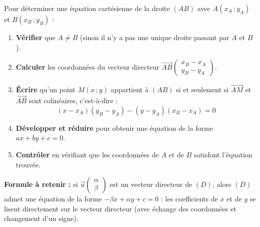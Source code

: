\documentclass[11pt]{article}
\begin{document}
\begin{methode}
Pour déterminer une équation cartésienne de la droite $(AB)$ avec $A(x_A\,;y_A)$ et $B(x_B\,;y_B)$ :
\begin{enumerate}
\item \textbf{Vérifier} que $A \neq B$ (sinon il n'y a pas une unique droite passant par $A$ et $B$).
\item \textbf{Calculer} les coordonnées du vecteur directeur $\overrightarrow{AB}\begin{pmatrix} x_B - x_A \\ y_B - y_A \end{pmatrix}$.
\item \textbf{Écrire} qu'un point $M(x\,;y)$ appartient à $(AB)$ si et seulement si $\overrightarrow{AM}$ et $\overrightarrow{AB}$ sont colinéaires, c'est-à-dire :
\[ (x - x_A)(y_B - y_A) - (y - y_A)(x_B - x_A) = 0 \]
\item \textbf{Développer et réduire} pour obtenir une équation de la forme $ax + by + c = 0$.
\item \textbf{Contrôler} en vérifiant que les coordonnées de $A$ et de $B$ satisfont l'équation trouvée.
\end{enumerate}
\textbf{Formule à retenir :} si $\vec{u}\begin{pmatrix} \alpha \\ \beta \end{pmatrix}$ est un vecteur directeur de $(D)$, alors $(D)$ admet une équation de la forme $-\beta x + \alpha y + c = 0$ : les coefficients de $x$ et de $y$ se lisent directement sur le vecteur directeur (avec échange des coordonnées et changement d'un signe).
\end{methode}
\end{document}
